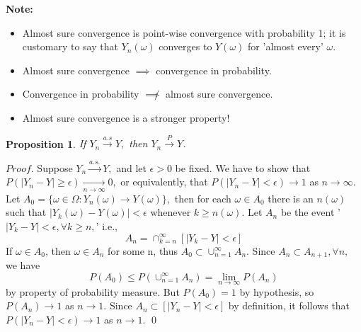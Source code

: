 \documentclass[12pt]{report} \addtolength{\textheight}{2in}
\newtheorem{prop}{Proposition}
\newcommand{\asto}{\overset{a.s.}{\longrightarrow}}
\begin{document}
\textbf{Note:}
\begin{itemize}
\item Almost sure convergence is point-wise convergence with probability 1; it is customary to say that $Y_n(\omega)$ converges to $Y(\omega)$ for 'almost every' $\omega$.
\item Almost sure convergence $\implies$ convergence in probability.
\item Convergence in probability $\not\implies$ almost sure convergence.
\item Almost sure convergence is a stronger property!
\end{itemize}
\begin{prop}
If $Y_n \overset{a.s}{\longrightarrow} Y,$ then $Y_n \overset{P}{\longrightarrow}Y$.
\end{prop}
$Proof.$ Suppose $Y_n \asto Y,$ and let $\epsilon > 0$ be fixed. We have to show that $P(|Y_n-Y|\geq \epsilon)\underset{n \to \infty} {\longrightarrow} 0,$ or equivalently, that $P(|Y_n-Y| < \epsilon) \to 1$ as $n\to \infty.$ Let $A_0=\{\omega \in \Omega: Y_{n}(\omega) \to Y(\omega)\},$ then for each $\omega \in A_0$ there is an $n(\omega)$ such that $|Y_k(\omega)-Y(\omega)| < \epsilon $ whenever $k \geq n(\omega).$ Let $A_n$ be the event '$|Y_k-Y| < \epsilon,  \forall k \geq n,$' i.e.,
\begin{displaymath}
A_n=\cap_{k=n}^{\infty} [|Y_k-Y| < \epsilon]
\end{displaymath}
If $\omega \in A_0$, then $\omega \in A_n$ for some n, thus $A_0 \subset \cup_{n=1}^{\infty} A_n$. Since $A_n \subset A_{n+1}, \forall n,$ we have 
\begin{displaymath}
P(A_0) \leq P(\cup_{n=1}^{\infty} A_n) =\lim_{n\to\infty} P(A_n)
\end{displaymath}
by property of probability measure. But $P(A_0)=1$ by hypothesis, so $P(A_n) \to 1$ as $n \to 1.$ Since $A_n \subset [|Y_n-Y|<\epsilon]$ by definition, it follows that $P(|Y_n-Y|<\epsilon) \to 1$ as $n \to 1.$ \qed
\end{document}
